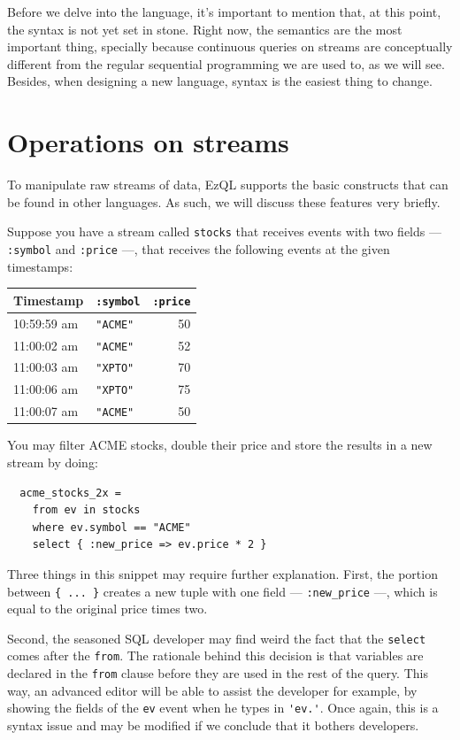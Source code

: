 \documentclass{report}
\begin{document}
Before we delve into the language, it's important to mention that, at
this point, the syntax is not yet set in stone. Right now, the
semantics are the most important thing, specially because continuous
queries on streams are conceptually different from the regular
sequential programming we are used to, as we will see. Besides, when
designing a new language, syntax is the easiest thing to change.

\section{Operations on streams}
\label{sec:stream-operations}

To manipulate raw streams of data, EzQL supports the basic constructs
that can be found in other languages. As such, we will discuss these
features very briefly.

Suppose you have a stream called \verb=stocks= that receives events
with two fields --- \verb=:symbol= and \verb=:price= ---, that
receives the following events at the given timestamps:

\begin{tabular}{ |l|l|r| }
  \hline
  Timestamp & \verb=:symbol= & \verb=:price= \\
  \hline
  10:59:59 am & \verb="ACME"= & 50 \\
  11:00:02 am & \verb="ACME"= & 52 \\
  11:00:03 am & \verb="XPTO"= & 70 \\
  11:00:06 am & \verb="XPTO"= & 75 \\
  11:00:07 am & \verb="ACME"= & 50 \\
  \hline
\end{tabular}

You may filter ACME stocks, double their price and store the results
in a new stream by doing:

\begin{lstlisting}
  acme_stocks_2x =
    from ev in stocks
    where ev.symbol == "ACME"
    select { :new_price => ev.price * 2 }
\end{lstlisting}

Three things in this snippet may require further explanation. First,
the portion between \verb={ ... }= creates a new tuple with one field
--- \verb=:new_price= ---, which is equal to the original price times
two.

Second, the seasoned SQL developer may find weird the fact that the
\verb=select= comes after the \verb=from=. The rationale behind this
decision is that variables are declared in the \verb=from= clause
before they are used in the rest of the query. This way, an advanced
editor will be able to assist the developer for example, by showing
the fields of the \verb=ev= event when he types in \verb='ev.'=. Once
again, this is a syntax issue and may be modified if we conclude that
it bothers developers.
\end{document}
